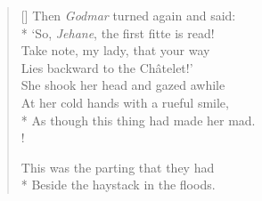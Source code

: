\documentclass[MAIN]{subfiles}
\begin{document}
\begin{verse}[\versewidth]
Then \emph{Godmar} turned again and said:\\*
`So, \emph{Jehane}, the first fitte is read!\\
Take note, my lady, that your way\\
Lies backward to the {\sc Ch\^atelet}!'\\
She shook her head and gazed awhile\\
At her cold hands with a rueful smile,\\*
As though this thing had made her mad.\\!

This was the parting that they had\\*
Beside the haystack in the floods.
\end{verse}
\end{document}
